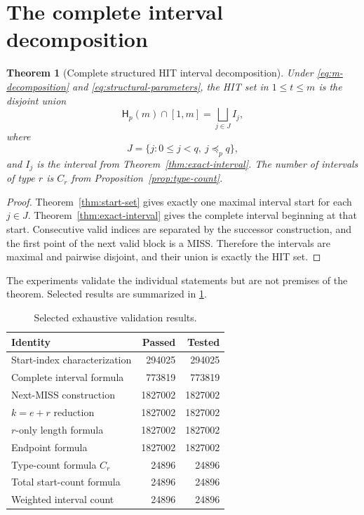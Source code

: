 \documentclass[11pt,a4paper]{article}
\newtheorem{theorem}{Theorem}[section]
\theoremstyle{definition}
\theoremstyle{remark}
\newcommand{\hit}{\mathsf{H}}
\begin{document}
\section{The complete interval decomposition}

\begin{theorem}[Complete structured HIT interval decomposition]
\label{thm:complete-interval}
Under \eqref{eq:m-decomposition} and \eqref{eq:structural-parameters}, the HIT set in $1\le t\le m$ is the disjoint union
\begin{equation}
\boxed{
\hit_p(m)\cap[1,m]
=
\bigsqcup_{j\in J} I_j,
}
\end{equation}
where
\[
J=\{j:0\le j<q,\ j\preceq_p q\},
\]
and $I_j$ is the interval from Theorem~\ref{thm:exact-interval}.  The number of intervals of type $r$ is $C_r$ from Proposition~\ref{prop:type-count}.
\end{theorem}

\begin{proof}
Theorem~\ref{thm:start-set} gives exactly one maximal interval start for each $j\in J$.  Theorem~\ref{thm:exact-interval} gives the complete interval beginning at that start.  Consecutive valid indices are separated by the successor construction, and the first point of the next valid block is a MISS.  Therefore the intervals are maximal and pairwise disjoint, and their union is exactly the HIT set.
\end{proof}

The experiments validate the individual statements but are not premises of the theorem.  Selected results are summarized in \cref{tab:validation}.

\begin{table}[ht]
\centering
\caption{Selected exhaustive validation results.}
\label{tab:validation}
\begin{tabular}{@{}lrr@{}}
\toprule
Identity & Passed & Tested \\
\midrule
Start-index characterization & 294025 & 294025 \\
Complete interval formula & 773819 & 773819 \\
Next-MISS construction & 1827002 & 1827002 \\
$k=e+r$ reduction & 1827002 & 1827002 \\
$r$-only length formula & 1827002 & 1827002 \\
Endpoint formula & 1827002 & 1827002 \\
Type-count formula $C_r$ & 24896 & 24896 \\
Total start-count formula & 24896 & 24896 \\
Weighted interval count & 24896 & 24896 \\
\bottomrule
\end{tabular}
\end{table}
\end{document}
